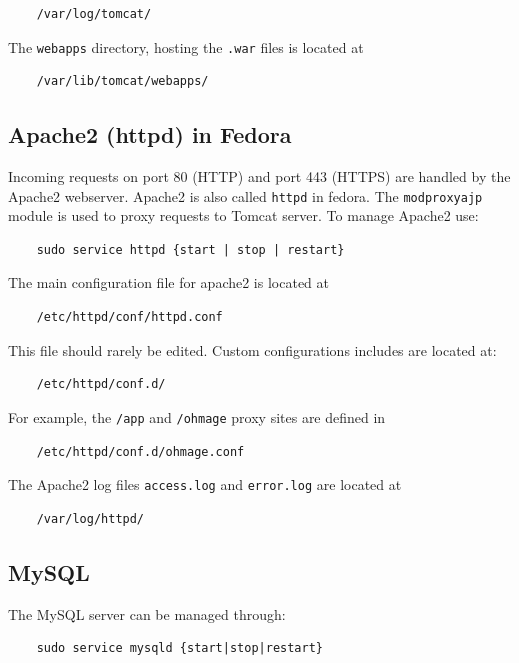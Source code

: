 \documentclass{scrartcl}
\begin{document}
\begin{verbatim}
    /var/log/tomcat/
\end{verbatim}
The \texttt{webapps} directory, hosting the \texttt{.war} files is located at

\begin{verbatim}
    /var/lib/tomcat/webapps/
\end{verbatim}

\subsection{Apache2 (httpd) in Fedora}

Incoming requests on port 80 (HTTP) and port 443 (HTTPS) are handled by the
Apache2 webserver. Apache2 is also called \texttt{httpd} in fedora. The
\texttt{mod\textunderscore proxy\textunderscore ajp} module is used to proxy
requests to Tomcat server. To manage Apache2 use:

\begin{verbatim}
    sudo service httpd {start | stop | restart}
\end{verbatim}
The main configuration file for apache2 is located at

\begin{verbatim}
    /etc/httpd/conf/httpd.conf
\end{verbatim}
This file should rarely be edited. Custom configurations includes are located
at:

\begin{verbatim}
    /etc/httpd/conf.d/
\end{verbatim}
For example, the \texttt{/app} and \texttt{/ohmage} proxy sites are defined in
\begin{verbatim}
    /etc/httpd/conf.d/ohmage.conf
\end{verbatim}
The Apache2 log files \texttt{access.log} and \texttt{error.log} are located at

\begin{verbatim}
    /var/log/httpd/
\end{verbatim}

\subsection{MySQL}

The MySQL server can be managed through:

\begin{verbatim}
    sudo service mysqld {start|stop|restart}
\end{verbatim}
\end{document}
